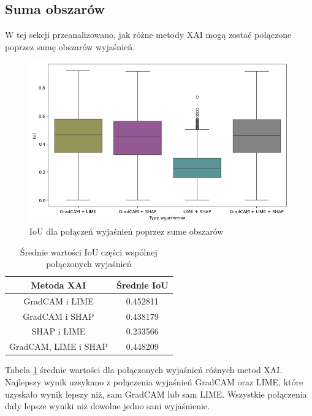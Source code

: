 \subsection*{Suma obszarów}
W tej sekcji przeanalizowano, jak różne metody XAI mogą zostać połączone poprzez sumę obszarów wyjaśnień.

\begin{figure}[h]
	\centering\includegraphics[width=.9\textwidth]{img/combine_iou_or}
	\caption{IoU dla połączeń wyjaśnień poprzez sume obszarów}  \label{rys:combine_iou_or}
\end{figure}
\begin{table}[h]
	\centering
	\begin{tabular}{|c|c|}
		\hline
		\textbf{Metoda XAI}  & Średnie IoU \\
		\hline
		GradCAM i LIME       & 0.452811    \\
		\hline
		GradCAM i SHAP       & 0.438179    \\
		\hline
		SHAP i LIME          & 0.233566    \\
		\hline
		GradCAM, LIME i SHAP & 0.448209    \\
		\hline
	\end{tabular}
	\caption{Średnie wartości IoU części wspólnej połączonych wyjaśnień}
	\label{tab:combineandiou}
\end{table}
Tabela \ref{tab:combineandiou} średnie wartości dla połączonych wyjaśnień różnych metod XAI.
Najlepszy wynik uzsykano z połączenia wyjaśnień GradCAM oraz LIME, które uzyskało wynik lepszy niż, sam GradCAM lub sam LIME.
Wszystkie połączenia dały lepsze wyniki niż dowolne jedno sani wyjaśnienie.

\vspace{1cm}

